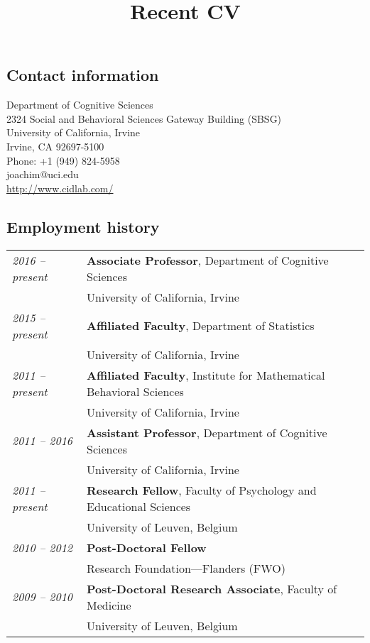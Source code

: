 \documentclass[]{article}
\title{Recent CV}
\def\slist{\begin{longtable}{>{\em}p{1.25in} p{5.0in}}}
\def\elist{\end{longtable}}
\renewcommand{\textbf}[1]{{\bf\color{Bordeaux}#1}}
\begin{document}
\vspace{1ex}\null

\subsection*{Contact information}
Department of Cognitive Sciences\\2324 Social and Behavioral Sciences Gateway Building (SBSG)\\University of California, Irvine\\Irvine, CA 92697-5100\\[1ex]\indent\indent Phone: +1 (949) 824-5958\\\indent\indent joachim@uci.edu\\\indent\indent \url{http://www.cidlab.com/}
    
\subsection*{Employment history}
\slist
  2016 -- present & \textbf{Associate Professor}, Department of Cognitive Sciences \\ 
                  & University of California, Irvine \\
  2015 -- present & \textbf{Affiliated Faculty}, Department of Statistics\\
                  & University of California, Irvine \\
  2011 -- present & \textbf{Affiliated Faculty}, Institute for Mathematical Behavioral Sciences\\
                  & University of California, Irvine \\
  2011 -- 2016    & \textbf{Assistant Professor}, Department of Cognitive Sciences \\ 
                  & University of California, Irvine \\
  2011 -- present & \textbf{Research Fellow}, Faculty of Psychology and Educational Sciences\\ 
                  & University of Leuven, Belgium \\
  2010 -- 2012    & \textbf{Post-Doctoral Fellow} \\
                  & Research Foundation---Flanders (FWO) \\
  2009 -- 2010    & \textbf{Post-Doctoral Research Associate}, Faculty of Medicine\\
                  & University of Leuven, Belgium \\
\elist
\end{document}
